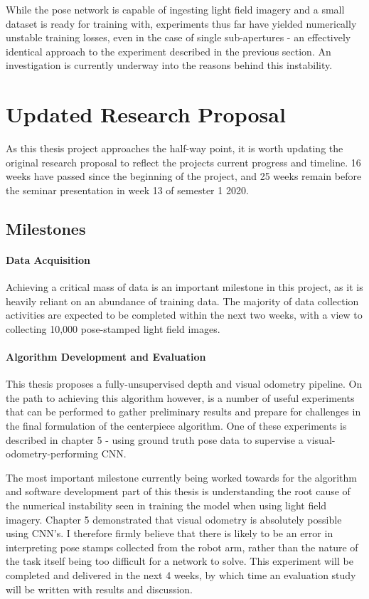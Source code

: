 \documentclass[openany]{book}
\begin{document}
While the pose network is capable of ingesting light field imagery and a small dataset is ready for training with, experiments thus far have yielded numerically unstable training losses, even in the case of single sub-apertures - an effectively identical approach to the experiment described in the previous section. An investigation is currently underway into the reasons behind this instability. 


\chapter{Updated Research Proposal}

As this thesis project approaches the half-way point, it is worth updating the original research proposal to reflect the projects current progress and timeline. 16 weeks have passed since the beginning of the project, and 25 weeks remain before the seminar presentation in week 13 of semester 1 2020.

\section{Milestones}

\subsubsection{Data Acquisition}
Achieving a critical mass of data is an important milestone in this project, as it is heavily reliant on an abundance of training data. The majority of data collection activities are expected to be completed within the next two weeks, with a view to collecting 10,000 pose-stamped light field images. 

\subsubsection{Algorithm Development and Evaluation}
This thesis proposes a fully-unsupervised depth and visual odometry pipeline. On the path to achieving this algorithm however, is a number of useful experiments that can be performed to gather preliminary results and prepare for challenges in the final formulation of the centerpiece algorithm. One of these experiments is described in chapter 5 - using ground truth pose data to supervise a visual-odometry-performing CNN. 

The most important milestone currently being worked towards for the algorithm and software development part of this thesis is understanding the root cause of the numerical instability seen in training the model when using light field imagery. Chapter 5 demonstrated that visual odometry is absolutely possible using CNN's. I therefore firmly believe that there is likely to be an error in interpreting pose stamps collected from the robot arm, rather than the nature of the task itself being too difficult for a network to solve. This experiment will be completed and delivered in the next 4 weeks, by which time an evaluation study will be written with results and discussion. 
\end{document}
